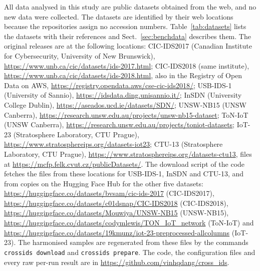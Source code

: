 All data analysed in this study are public datasets obtained from the web, and no new data were collected.
The datasets are identified by their web locations because the repositories assign no accession numbers.
Table~\ref{tab:datasets} lists the datasets with their references and Sect.~\ref{sec:benchdata} describes them.
The original releases are at the following locations:
CIC-IDS2017 (Canadian Institute for Cybersecurity, University of New Brunswick), \url{https://www.unb.ca/cic/datasets/ids-2017.html};
CIC-IDS2018 (same institute), \url{https://www.unb.ca/cic/datasets/ids-2018.html}, also in the Registry of Open Data on AWS, \url{https://registry.opendata.aws/cse-cic-ids2018/};
USB-IDS-1 (University of Sannio), \url{https://idsdata.ding.unisannio.it/};
InSDN (University College Dublin), \url{https://aseados.ucd.ie/datasets/SDN/};
UNSW-NB15 (UNSW Canberra), \url{https://research.unsw.edu.au/projects/unsw-nb15-dataset};
ToN-IoT (UNSW Canberra), \url{https://research.unsw.edu.au/projects/toniot-datasets};
IoT-23 (Stratosphere Laboratory, CTU Prague), \url{https://www.stratosphereips.org/datasets-iot23};
CTU-13 (Stratosphere Laboratory, CTU Prague), \url{https://www.stratosphereips.org/datasets-ctu13}, files at \url{https://mcfp.felk.cvut.cz/publicDatasets/}.
The download script of the code fetches the files from these locations for USB-IDS-1, InSDN and CTU-13, and from copies on the Hugging Face Hub for the other five datasets:
\url{https://huggingface.co/datasets/bvsam/cic-ids-2017} (CIC-IDS2017),
\url{https://huggingface.co/datasets/c01dsnap/CIC-IDS2018} (CIC-IDS2018),
\url{https://huggingface.co/datasets/Mouwiya/UNSW-NB15} (UNSW-NB15),
\url{https://huggingface.co/datasets/codymlewis/TON_IoT_network} (ToN-IoT) and
\url{https://huggingface.co/datasets/19kmunz/iot-23-preprocessed-allcolumns} (IoT-23).
The harmonised samples are regenerated from these files by the commands \texttt{crossids download} and \texttt{crossids prepare}.
The code, the configuration files and every raw per-run result are in \url{https://github.com/vinhqdang/cross_ids}.
